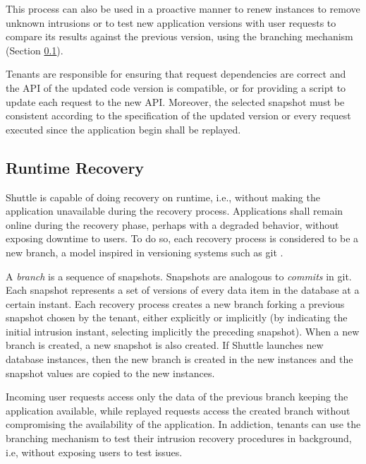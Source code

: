 This process can also be used in a proactive manner to renew instances to remove unknown intrusions \cite{Castro2002,Sousa2010} or to test new application versions with user requests to compare its results against the previous version, using the branching mechanism  (Section \ref{sec:arch:runtime_recovery}).

Tenants are responsible for ensuring that request dependencies are correct and the {API} of the updated code version is compatible, or for providing a script to update each request to the new \ac{API}. Moreover, the selected snapshot must be consistent according to the specification of the updated version or every request executed since the application begin shall be replayed.



\subsection{Runtime Recovery}
\label{sec:arch:runtime_recovery}

Shuttle is capable of doing recovery on runtime, i.e., without making the application unavailable during the recovery process. Applications shall remain online during the recovery phase, perhaps with a degraded behavior, without exposing downtime to users. To do so, each recovery process is considered to be a new branch, a model inspired in versioning systems such as git \cite{git}.

A \emph{branch} is a sequence of snapshots. Snapshots are analogous to \textit{commits} in git. Each snapshot represents a set of versions of every data item in the database at a certain instant. Each recovery process creates a new branch forking a previous snapshot chosen by the tenant, either explicitly or implicitly (by indicating the initial intrusion instant, selecting implicitly the preceding snapshot). When a new branch is created, a new snapshot is also created. If Shuttle launches new database instances, then the new branch is created in the new instances and the snapshot values are copied to the new instances.

Incoming user requests access only the data of the previous branch keeping the application available, while replayed requests access the created branch without compromising the availability of the application. In addiction, tenants can use the branching mechanism to test their intrusion recovery procedures in background, i.e, without exposing users to test issues.\\



